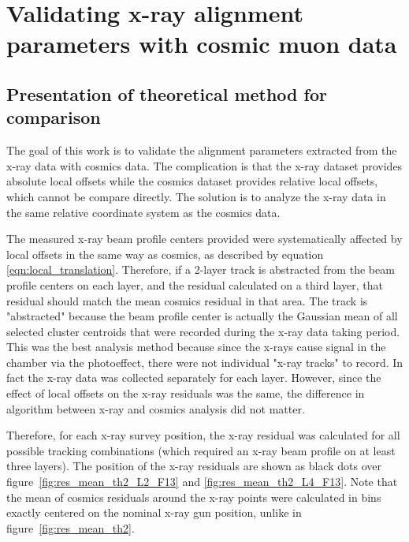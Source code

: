 
\chapter{Validating x-ray alignment parameters with cosmic muon data}
\label{chap:comparison}

\section{Presentation of theoretical method for comparison}

The goal of this work is to validate the alignment parameters extracted from the x-ray data with cosmics data. The complication is that the x-ray dataset provides absolute local offsets while the cosmics dataset provides relative local offsets, which cannot be compare directly. The solution is to analyze the x-ray data in the same relative coordinate system as the cosmics data.


The measured x-ray beam profile centers provided were systematically affected by local offsets in the same way as cosmics, as described by equation \ref{eqn:local_translation}. Therefore, if a 2-layer track is abstracted from the beam profile centers on each layer, and the residual calculated on a third layer, that residual should match the mean cosmics residual in that area. The track is "abstracted" because the beam profile center is actually the Gaussian mean of all selected cluster centroids that were recorded during the x-ray data taking period. This was the best analysis method because since the x-rays cause signal in the chamber via the photoeffect, there were not individual "x-ray tracks" to record. In fact the x-ray data was collected separately for each layer. However, since the effect of local offsets on the x-ray residuals was the same, the difference in algorithm between x-ray and cosmics analysis did not matter. 

Therefore, for each x-ray survey position, the x-ray residual was calculated for all possible tracking combinations (which required an x-ray beam profile on at least three layers). The position of the x-ray residuals are shown as black dots over figure~\ref{fig:res_mean_th2_L2_F13} and \ref{fig:res_mean_th2_L4_F13}. Note that the mean of cosmics residuals around the x-ray points were calculated in bins exactly centered on the nominal x-ray gun position, unlike in figure~\ref{fig:res_mean_th2}.

